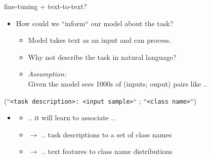 \begin{frame}{fine-tuning + text-to-text?}

\vfill

\begin{itemize}
	\item \ques How could we ``inform`` our model about the task?
			\begin{itemize}
				\item Model takes text as an input and can process.
				\item Why not describe the task in natural language?
				\item \textit{Assumption:}\\
							Given the model sees 1000s of (inputs; ouput) pairs like ..
			\end{itemize}
\end{itemize}

		\begin{center}
				{\small
					(``\texttt{<task description>: <input sample>}`` ; ``\texttt{<class name>}``)
				}
		\end{center}
				
\begin{itemize}
			\item[]
			\begin{itemize}
				\item .. it will learn to associate ..
				\item[] $\to$ .. task descriptions to a set of class names
				\item[] $\to$ .. text features to class name distributions
			\end{itemize}
\end{itemize}

\vfill

\end{frame}


